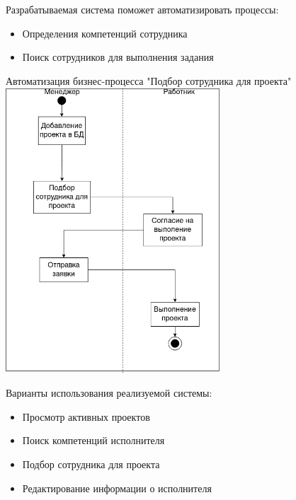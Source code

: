 \documentclass[PI,KR]{HSEUniversity}
\begin{document}
Разрабатываемая система поможет автоматизировать процессы:
\begin{itemize}
	\item Определения компетенций сотрудника
	\item Поиск сотрудников для выполнения задания
\end{itemize}
\begin{FIGURE}[h]{Автоматизация бизнес-процесса "Подбор сотрудника для проекта" \label{fig:figure1}}
	\includegraphics[width=0.6\textwidth]{img/Диаграмма Бизнес-процесса}
\end{FIGURE}
Варианты использования реализуемой системы:
\begin{itemize}
	\item Просмотр активных проектов
	\item Поиск компетенций исполнителя
	\item Подбор сотрудника для проекта
	\item Редактирование информации о исполнителя
\end{itemize}
\end{document}
